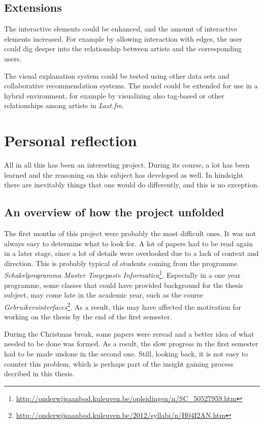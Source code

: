 \subsection{Extensions}

The interactive elements could be enhanced, and the amount of interactive elements increased. For example by allowing interaction with edges, the user could dig deeper into the relationship between artists and the corresponding users.

The visual explanation system could be tested using other data sets and collaborative recommendation systems. The model could be extended for use in a hybrid environment, for example by visualizing also tag-based or other relationships among artists in \emph{Last.fm}.


\section{Personal reflection}

All in all this has been an interesting project. During its course, a lot has been learned and the reasoning on this subject has developed as well. In hindsight there are inevitably things that one would do differently, and this is no exception.

\subsection{An overview of how the project unfolded}

The first months of this project were probably the most difficult ones. It was not always easy to determine what to look for. A lot of papers had to be read again in a later stage, since a lot of details were overlooked due to a lack of context and direction. This is probably typical of students coming from the programme \emph{Schakelprogramma Master Toegepaste Informatica}\footnote{\url{http://onderwijsaanbod.kuleuven.be/opleidingen/n/SC_50527959.htm}}. Especially in a one year programme, some classes that could have provided background for the thesis subject, may come late in the academic year, such as the course \emph{Gebruikersinterfaces}\footnote{\url{http://onderwijsaanbod.kuleuven.be/2012/syllabi/n/H04I2AN.htm}}. As a result, this may have affected the motivation for working on the thesis by the end of the first semester.

During the Christmas break, some papers were reread and a better idea of what needed to be done was formed. As a result, the slow progress in the first semester had to be made undone in the second one. Still, looking back, it is not easy to counter this problem, which is perhaps part of the insight gaining process decribed in this thesis.



